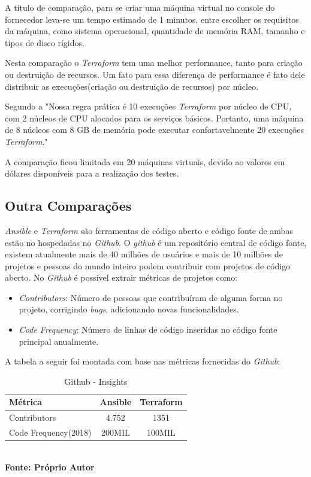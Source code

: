 A titulo de comparação, para se criar uma máquina virtual no console do fornecedor leva-se um tempo estimado de 1 minutos, entre escolher os requisitos da máquina, como sistema operacional, quantidade de memória RAM, tamanho e tipos de disco rígidos. 

Nesta comparação o \textit{Terraform} tem uma melhor performance, tanto para criação ou destruição de recursos. Um fato para essa diferença de performance é fato dele distribuir as execuções(criação ou destruição de recursos) por núcleo. 

Segundo a \cite{hashcorp03} "Nossa regra prática é 10 execuções \textit{Terraform} por núcleo de CPU, com 2 núcleos de CPU alocados para os serviços básicos.  Portanto, uma máquina de 8 núcleos com 8 GB de memória pode executar confortavelmente 20 execuções \textit{Terraform}."

A comparação ficou limitada em 20 máquinas virtuais, devido ao valores em dólares disponíveis para a realização dos testes. 

\subsection{Outra Comparações}
\textit{Ansible} e \textit{Terraform} são ferramentas de código aberto e código fonte de ambas estão no hospedadas no \textit{Github}. O \textit{github} é um repositório central de código fonte, existem atualmente mais de 40 milhões de usuários e mais de 10 milhões de projetos e pessoas do mundo inteiro podem contribuir com projetos de código aberto. No \textit{Github} é possível extrair métricas de projetos como: 

\begin{itemize}
    \item  \textit{Contributors}: Número de pessoas que contribuíram de alguma forma no projeto, corrigindo \textit{bugs}, adicionando novas funcionalidades.
     \item \textit{Code Frequency}: Número de linhas de código inseridas no código fonte principal anualmente. 
\end{itemize}

A tabela a seguir foi montada com base nas métricas fornecidas do \textit{Github}: 
   \begin{table}[ht]
	\centering
	\caption{\hspace{0.1cm} Github - Insights}
	\vspace{-0.3cm} %
	\label{tab:tabela3}
	\begin{tabular}{l|c|c}
  \hline
    \textbf{Métrica}	& \textbf{Ansible} & \textbf{Terraform} \\
    \hline
  Contributors & 4.752  & 1351\\
  Code Frequency(2018)  & 200MIL  &   100MIL  \\
     \hline
 \end{tabular}
 	\vspace{.1cm}  %
	\small
	{\footnotesize\\ \textbf{Fonte: Próprio Autor}}
\end{table}

